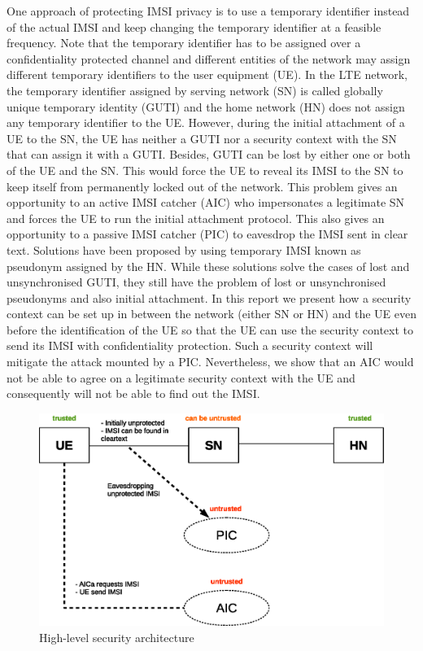 \documentclass[lnicst,sechang,a4paper]{svmultln}
\begin{document}
One approach of protecting IMSI privacy is to use a temporary identifier instead of the actual IMSI and keep changing the temporary identifier at a feasible frequency. Note that the temporary identifier has to be assigned over a confidentiality protected channel and different entities of the network may assign different temporary identifiers to the user equipment (UE). In the LTE network, the temporary identifier assigned by serving network (SN) is called globally unique temporary identity (GUTI) and the home network (HN) does not assign any temporary identifier to the UE. However, during the initial attachment of a UE to the SN, the UE has neither a GUTI nor a security context with the SN that can assign it with a GUTI. Besides, GUTI can be lost by either one or both of the UE and the SN. This would force the UE to reveal its IMSI to the SN to keep itself from permanently locked out of the network. This problem gives an opportunity to an active IMSI catcher (AIC) who impersonates a legitimate SN and forces the UE to run the initial attachment protocol. This also gives an opportunity to a passive IMSI catcher (PIC) to eavesdrop the IMSI sent in clear text. Solutions \cite{pseudonym_valtteri_philip, pseudonym_ericsson} have been proposed by using temporary IMSI known as pseudonym assigned by the HN. While these solutions solve the cases of lost and unsynchronised GUTI, they still have the problem of lost or unsynchronised pseudonyms and also initial attachment. In this report we present how a security context can be set up in between the network (either SN or HN) and the UE even before the identification of the UE so that the UE can use the security context to send its IMSI with confidentiality protection. Such a security context will mitigate the attack mounted by a PIC. Nevertheless, we show that an AIC would not be able to agree on a legitimate security context with the UE and consequently will not be able to find out the IMSI.

\begin{figure}
\begin{center}
  \includegraphics[width=.98\textwidth]{security_architecture_abstraction.eps}
\caption{High-level security architecture}
\label{fig:security_architecture_abstraction}       %
\end{center}
\end{figure}
\end{document}
